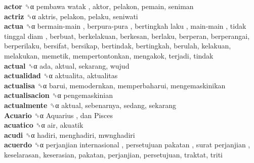 \textbf{actor} ␝α   pembawa watak , aktor, pelakon, pemain, seniman  \\
\textbf{actriz} ␝α  aktris, pelakon, pelaku, seniwati  \\
\textbf{actua} ␝α   bermain-main ,  berpura-pura ,  bertingkah laku ,  main-main ,  tidak tinggal diam , berbuat, berkelakuan, berkesan, berlaku, berperan, berperangai, berperilaku, bersifat, bersikap, bertindak, bertingkah, berulah, kelakuan, melakukan, memetik, mempertontonkan, mengakok, terjadi, tindak  \\
\textbf{actual} ␝α  ada, aktual, sekarang, wujud  \\
\textbf{actualidad} ␝α  aktualita, aktualitas  \\
\textbf{actualisa} ␝α  barui, memodernkan, memperbaharui, mengemaskinikan  \\
\textbf{actualisacion} ␝α  pengemaskinian  \\
\textbf{actualmente} ␝α  aktual, sebenarnya, sedang, sekarang  \\
\textbf{Acuario} ␝α   Aquarius ,  dan Pisces   \\
\textbf{acuatico} ␝α  air, akuatik  \\
\textbf{acudi} ␝α  hadiri, menghadiri, mwnghadiri  \\
\textbf{acuerdo} ␝α   perjanjian internasional ,  persetujuan pakatan ,  surat perjanjian , keselarasan, keserasian, pakatan, perjanjian, persetujuan, traktat, triti  \\
